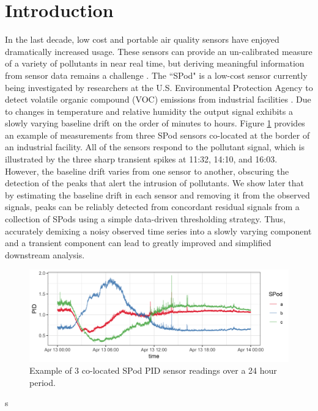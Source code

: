 \documentclass[aoas]{imsart}
\begin{document}
\begin{frontmatter}

\begin{keyword}
\end{keyword}

\end{frontmatter}


\section{Introduction}
\label{sec:intro}
In the last decade, low cost and portable air quality sensors have enjoyed dramatically increased usage. These sensors can provide an un-calibrated measure of a variety of pollutants in near real time, but deriving meaningful information from sensor data remains a challenge \citep{snyder2013changing}. The ``SPod" is a low-cost sensor currently being investigated by researchers at the U.S. Environmental Protection Agency to detect volatile organic compound (VOC) emissions from industrial facilities \citep{thoma2016south}. Due to changes in temperature and relative humidity the output signal exhibits a slowly varying baseline drift on the order of minutes to hours. Figure \ref{fig:raw_spod} provides an example of measurements from three SPod sensors co-located at the border of an industrial facility. All of the sensors respond to the pollutant signal, which is illustrated by the three sharp transient spikes at 11:32, 14:10, and 16:03. However, the baseline drift varies from one sensor to another, obscuring the detection of the peaks that alert the intrusion of pollutants. We show later that by estimating the baseline drift in each sensor and  removing it from the observed signals, peaks can be reliably detected from concordant residual signals from a collection of SPods using a simple data-driven thresholding strategy. Thus, accurately demixing a noisy observed time series into a slowly varying component and a transient component can lead to greatly improved and simplified downstream analysis. 

\begin{figure}[t!]
	\includegraphics[width = \linewidth]{Figures/uncorrected_data.png}
	\caption{Example of 3 co-located SPod PID sensor readings over a 24 hour period.}
	\label{fig:raw_spod}
\end{figure}s
\end{document}
